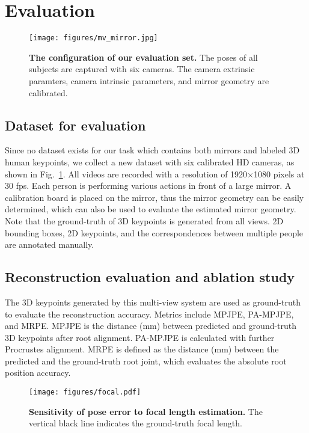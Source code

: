 \section{Evaluation}
\begin{figure}[t]
	\centering
	\texttt{[image: figures/mv\_mirror.jpg]}
	\vspace{0.2mm}
	\caption{
	\textbf{The configuration of our evaluation set.} The poses of all subjects are captured with six cameras. The camera extrinsic paramters, camera intrinsic parameters, and mirror geometry are calibrated.
	}
	\label{fig:mv_mirror}
\end{figure}

\subsection{Dataset for evaluation}
Since no dataset exists for our task which contains both mirrors and labeled 3D human keypoints, we collect a new dataset with six calibrated HD cameras, as shown in Fig.~\ref{fig:mv_mirror}. All videos are recorded with a resolution of 1920$\times$1080 pixels at 30 fps. 
Each person is performing various actions in front of a large mirror. A calibration board is placed on the mirror, thus the mirror geometry can be easily determined, which can also be used to evaluate the estimated mirror geometry. Note that the ground-truth of 3D keypoints is generated from all views.
2D bounding boxes, 2D keypoints, and the correspondences between multiple people are annotated manually.

\subsection{Reconstruction evaluation and ablation study}
\label{sec:mv-mirror}

The 3D keypoints generated by this multi-view system are used as ground-truth to evaluate the reconstruction accuracy. Metrics include MPJPE, PA-MPJPE, and MRPE. MPJPE is the distance (mm) between predicted and ground-truth 3D keypoints after root alignment. PA-MPJPE is calculated with further Procrustes alignment. MRPE is defined as the distance (mm) between the predicted and the ground-truth root joint, which evaluates the absolute root position accuracy.

\begin{figure}[t]
	\centering
	\texttt{[image: figures/focal.pdf]}
	\caption{\textbf{Sensitivity of pose error to focal length estimation.} The vertical black line indicates the ground-truth focal length.}
	\vspace{-1mm}
	\label{fig:focal}
\end{figure}
